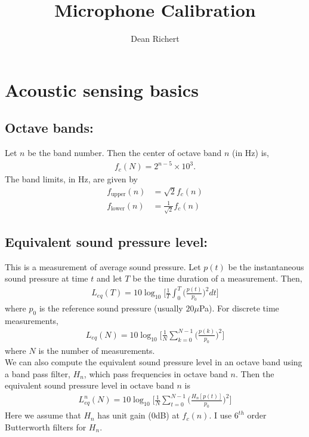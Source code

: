 \documentclass{article}
\title{Microphone Calibration}
\author{Dean Richert}
\begin{document}
\maketitle

\section{Acoustic sensing basics}

\subsection{Octave bands:} Let $n$ be the band number. Then the center of octave band $n$ (in Hz) is,
\begin{align*}
    f_c(N) = 2^{n-5} \times 10^3.
\end{align*}
The band limits, in Hz, are given by
\begin{align*}
    f_{\text{upper}}(n) &= \sqrt{2} f_c(n)
    \\ 
    f_{\text{lower}}(n) &= \frac{1}{\sqrt{2}} f_c(n)
\end{align*}

\subsection{Equivalent sound pressure level:} This is a measurement of average sound pressure. Let $p(t)$ be the instantaneous sound pressure at time $t$ and let $T$ be the time duration of a measurement. Then,
\begin{align*}
    L_{eq}(T) = 10 \log_{10}\bigg[\frac{1}{T} \int_0^T\bigg(\frac{p(t)}{p_0}\bigg)^2 dt\bigg]
\end{align*}
where $p_0$ is the reference sound pressure (usually $20\mu$Pa). For discrete time measurements, 
\begin{align*}
    L_{eq}(N) = 10 \log_{10}\bigg[\frac{1}{N} \sum_{k=0}^{N-1}\bigg(\frac{p(k)}{p_0}\bigg)^2 \bigg]
\end{align*}
where $N$ is the number of measurements. 
\\
We can also compute the equivalent sound pressure level in an octave band using a band pass filter, $H_n$, which pass frequencies in octave band $n$. Then the equivalent sound pressure level in octave band $n$ is
\begin{align*}
    L_{eq}^n(N) = 10 \log_{10}\bigg[\frac{1}{N} \sum_{t=0}^{N-1}\bigg(\frac{H_n[p(t)]}{p_0}\bigg)^2 \bigg]
\end{align*}
Here we assume that $H_n$ has unit gain ($0$dB) at $f_c(n)$. I use $6^{th}$ order Butterworth filters for $H_n$.
\end{document}
